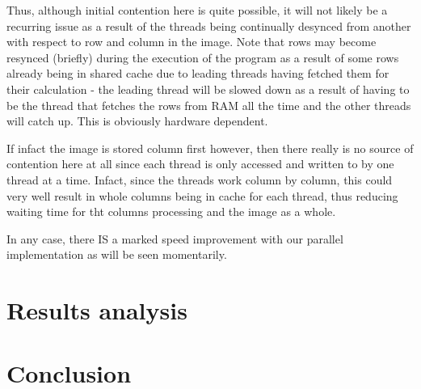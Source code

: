 \documentclass[paper=a4, fontsize=11pt]{scrartcl} %
\numberwithin{equation}{section} %
\numberwithin{figure}{section} %
\numberwithin{table}{section} %
\begin{document}
Thus, although initial contention here is quite possible, it will not likely be a recurring issue as a result of the threads being continually desynced from another with respect to row and column in the image. Note that rows may become resynced (briefly) during the execution of the program as a result of some rows already being in shared cache due to leading threads having fetched them for their calculation - the leading thread will be slowed down as a result of having to be the thread that fetches the rows from RAM all the time and the other threads will catch up. This is obviously hardware dependent.

If infact the image is stored column first however, then there really is no source of contention here at all since each thread is only accessed and written to by one thread at a time. Infact, since the threads work column by column, this could very well result in whole columns being in cache for each thread, thus reducing waiting time for tht columns processing and the image as a whole.

In any case, there IS a marked speed improvement with our parallel implementation as will be seen momentarily.
\section{Results analysis}

\section{Conclusion}
\end{document}
